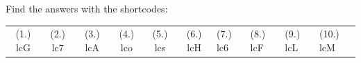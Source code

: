     \label{m39263**end}
  \label{108b030756318cdc732e3f8c9c583cfb**end}
\par {} Find the answers with the shortcodes:
 \par \begin{tabular}[h]{cccccc}
 (1.) lcG  &  (2.) lc7  &  (3.) lcA  &  (4.) lco  &  (5.) lcs  &  (6.) lcH  &  (7.) lc6  &  (8.) lcF  &  (9.) lcL  &  (10.) lcM  & \end{tabular}
